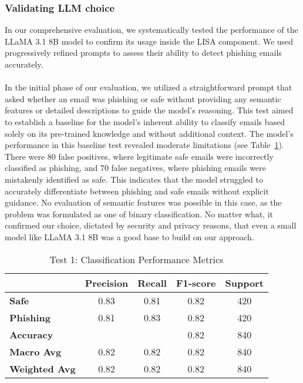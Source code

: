 \subsubsection{Validating LLM choice}
In our comprehensive evaluation, we systematically tested the performance of the LLaMA 3.1 8B model to confirm its usage inside the LISA component. We used progressively refined prompts to assess their ability to detect phishing emails accurately.  \\ \\
In the initial phase of our evaluation, we utilized a straightforward prompt that asked whether an email was phishing or safe without providing any semantic features or detailed descriptions to guide the model's reasoning. This test aimed to establish a baseline for the model's inherent ability to classify emails based solely on its pre-trained knowledge and without additional context. The model's performance in this baseline test revealed moderate limitations (see Table~\ref{tab:test1}). There were 80 false positives, where legitimate safe emails were incorrectly classified as phishing, and 70 false negatives, where phishing emails were mistakenly identified as safe. This indicates that the model struggled to accurately differentiate between phishing and safe emails without explicit guidance. No evaluation of semantic features was possible in this case, as the problem was formulated as one of binary classification. No matter what, it confirmed our choice, dictated by security and privacy reasons, that even a small model like LLaMA 3.1 8B was a good base to build on our approach.

\begin{table}[ht]
\centering
\caption{Test 1: Classification Performance Metrics}
\label{tab:test1}
\begin{tabular}{lcccc}
\toprule
& \textbf{Precision} & \textbf{Recall} & \textbf{F1-score} & \textbf{Support} \\
\midrule
\textbf{Safe}       & 0.83 & 0.81 & 0.82 & 420 \\
\textbf{Phishing}   & 0.81 & 0.83 & 0.82 & 420 \\
\midrule
\textbf{Accuracy}   & & & 0.82 & 840 \\
\textbf{Macro Avg}  & 0.82 & 0.82 & 0.82 & 840 \\
\textbf{Weighted Avg} & 0.82 & 0.82 & 0.82 & 840 \\
\bottomrule
\end{tabular}
\end{table}


